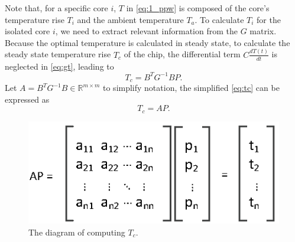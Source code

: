 


Note that, for a specific core $i$, $T$ in \eqref{eq:1_ppw} is composed of the core's temperature rise $T_{i}$ and the ambient temperature $T_{a}$. To calculate $T_{i}$ for the isolated core $i$, we need to extract relevant information from the $G$ matrix. Because the optimal temperature is calculated in steady state, to calculate the steady state temperature rise $T_{c}$ of the chip, the differential term $C\frac{dT(t)}{dt}$ is neglected in 
\eqref{eq:gt}, leading to
\begin{equation}\label{eq:tc}
T_{c} = B^{T}G^{-1}BP.
\end{equation}
Let $A = B^{T}G^{-1}B \in \mathbb{R}^{m \times m}$ to simplify notation, the simplified 
\eqref{eq:tc} can be expressed as
\begin{equation}\label{sim_tc}
T_{c} = AP.
\end{equation}

\begin{figure}
\centering
\includegraphics[width=0.7\linewidth]{fig/ap.eps}
\caption{The diagram of computing $T_{c}$.}
\label{fig:apt}
\end{figure}


